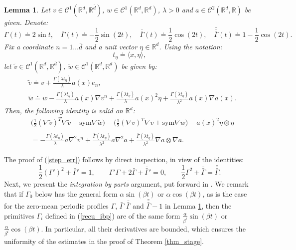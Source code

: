 \documentclass[reqno,twoside,11pt]{amsart}
\newcommand{\sym}{\mathrm{sym}}
\newcommand{\R}{\mathbb{R}}
\newcommand*{\dbar}[1]{\bar{\bar{#1}}}
\newcommand*{\tbar}[1]{\bar{\dbar{#1}}}
\numberwithin{equation}{section}
\theoremstyle{plain}
\newtheorem{lemma}[theorem]{Lemma}
\theoremstyle{definition}
\begin{document}
\begin{lemma}\label{lem_step2}
Let $v\in \mathcal{C}^1(\R^d, \R^{\bar d})$, $w\in \mathcal{C}^1(\R^d,
\R^{d})$, $\lambda>0$ and $a\in \mathcal{C}^2(\R^d,\R)$ be given. Denote: 
$$\Gamma(t) \doteq 2\sin t,\quad \bar\Gamma(t) \doteq -\frac{1}{2}\sin (2t),\quad
\dbar\Gamma(t) \doteq \frac{1}{2}\cos (2t),\quad 
\tbar\Gamma(t) \doteq 1- \frac{1}{2}\cos(2t).$$
Fix a coordinate $n=1\ldots \bar d$ and a unit vector $\eta\in\R^d$. Using the notation:
$$t_\eta \doteq \langle x, \eta\rangle,$$
let $\tilde v\in \mathcal{C}^1(\R^d, \R^{\bar d})$, $\tilde w\in
\mathcal{C}^1(\R^d, \R^{d})$ be given by:
\begin{equation}\label{defi_per}
\begin{split}
& \tilde v \doteq v + \frac{\Gamma(\lambda t_\eta)}{\lambda} a(x) e_n,
\\ & \tilde w \doteq w -\frac{\Gamma(\lambda t_\eta)}{\lambda} a(x)\nabla v^n
+ \frac{\Gamma(\lambda t_\eta)}{\lambda} a(x)^2\eta + 
\frac{\Gamma(\lambda t_\eta)}{\lambda^2} a(x)\nabla a(x).
\end{split}
\end{equation}
Then, the following identity is valid on $\R^d$:
\begin{equation}\label{step_err}
\begin{split}
& \big(\frac{1}{2}(\nabla \tilde v)^T \nabla \tilde v + \sym\nabla \tilde w\big) - 
\big(\frac{1}{2}(\nabla v)^T \nabla v + \sym\nabla w\big) - a(x)^2\eta\otimes \eta
\\ & = -\frac{\Gamma(\lambda t_\eta)}{\lambda} a \nabla^2 v^n
+ \frac{\dbar\Gamma(\lambda  t_\eta) }{\lambda^2} a\nabla^2 a
+ \frac{\tbar\Gamma(\lambda  t_\eta)}{\lambda^2}\nabla a\otimes\nabla a.
\end{split}
\end{equation}
\end{lemma}

\medskip

\noindent The proof of (\ref{step_err}) follows by direct inspection, in view of the identities:
$$ \frac{1}{2} (\Gamma')^2+ \bar\Gamma'=1, \qquad
\Gamma'\Gamma  + 2\bar\Gamma + \dbar\Gamma' =0, \qquad
\frac{1}{2}\Gamma^2 + \dbar\Gamma = \tbar\Gamma.$$
Next, we present the  {\em integration by parts} argument, put
forward in \cite{CHI2}. We remark that if $\Gamma_0$ below has the
general form $\alpha\sin(\beta t)$ or 
$\alpha \cos(\beta t)$, as is the case for the zero-mean periodic profiles $\Gamma$, $\bar\Gamma$
$\dbar\Gamma$ and $\tbar\Gamma -1$ in Lemma \ref{lem_step2}, then the
primitives $\Gamma_i$ defined in (\ref{recu_ibp}) are of the same form
$\frac{\alpha}{\beta^i}\sin(\beta t)$ or $\frac{\alpha}{\beta^i}\cos(\beta t)$. In particular, all their
derivatives are bounded, which ensures the uniformity of the estimates
in the proof of Theorem \ref{thm_stage}. 
\end{document}
